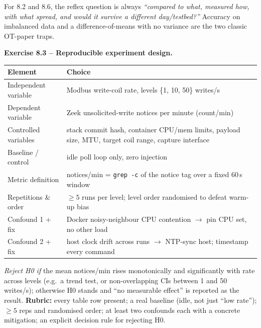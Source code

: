 \documentclass[11pt,a4paper]{article}
\begin{document}
\begin{hintbox}
For 8.2 and 8.6, the reflex question is always \emph{``compared to what, measured
how, with what spread, and would it survive a different day/testbed?''} Accuracy on
imbalanced data and a difference-of-means with no variance are the two classic OT-paper traps.
\end{hintbox}

\begin{solutionbox}
\textbf{Exercise 8.3 -- Reproducible experiment design.}
\vspace{0.5mm}
{\footnotesize
\par\begin{tabular}{@{}p{4.0cm}p{11.4cm}@{}}
\toprule
\textbf{Element} & \textbf{Choice} \\
\midrule
Independent variable & Modbus write-coil rate, levels \{1, 10, 50\} writes/s \\
Dependent variable & Zeek unsolicited-write notices per minute (count/min) \\
Controlled variables & stack commit hash, container CPU/mem limits, payload size, MTU, target coil range, capture interface \\
Baseline / control & idle poll loop only, zero injection \\
Metric definition & notices/min = \texttt{grep -c} of the notice tag over a fixed 60\,s window \\
Repetitions \& order & $\geq 5$ runs per level; level order randomised to defeat warm-up bias \\
Confound 1 + fix & Docker noisy-neighbour CPU contention $\to$ pin CPU set, no other load \\
Confound 2 + fix & host clock drift across runs $\to$ NTP-sync host; timestamp every command \\
\bottomrule
\end{tabular}}
\vspace{0.5mm}
\textit{Reject H0 if} the mean notices/min rises monotonically and significantly
with rate across levels (e.g.\ a trend test, or non-overlapping CIs between 1 and
50 writes/s); otherwise H0 stands and ``no measurable effect'' is reported as the
result. \textbf{Rubric:} every table row present; a real baseline (idle, not just
``low rate''); $\geq 5$ reps and randomised order; at least two confounds each with
a concrete mitigation; an explicit decision rule for rejecting H0.
\end{solutionbox}
\end{document}
